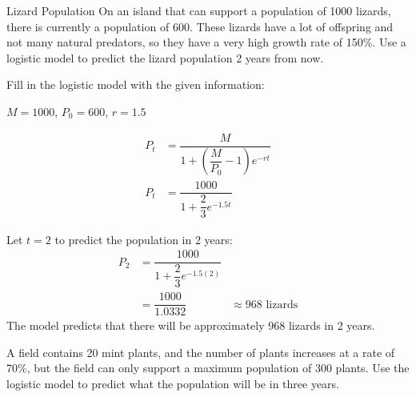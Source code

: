 \begin{example}[https://www.youtube.com/watch?v=cd5xQCfLUZM&list=PLfmpjsIzhztutjEb8Pg5OBOlI1p80yVoy&index=13]{Lizard Population}
On an island that can support a population of 1000 lizards, there is currently a population of 600.  These lizards have a lot of offspring and not many natural predators, so they have a very high growth rate of 150\%.  Use a logistic model to predict the lizard population 2 years from now.

\solline
{}
Fill in the logistic model with the given information:
\begin{center}
$M=1000$, $P_0=600$, $r=1.5$
\end{center}
\begin{align*}
P_t &= \dfrac{M}{1+\left(\dfrac{M}{P_0}-1\right)e^{-rt}}\\
P_t &= \dfrac{1000}{1+\dfrac{2}{3}e^{-1.5t}}
\end{align*}

\begin{center}
\end{center}

Let $t=2$ to predict the population in 2 years:
\begin{align*}
P_2 &= \dfrac{1000}{1+\dfrac{2}{3}e^{-1.5(2)}}\\
 &= \dfrac{1000}{1.0332}
 &\approx \boxed{968 \textrm{ lizards}}
\end{align*}
The model predicts that there will be approximately 968 lizards in 2 years.
\end{example}

\begin{try}
A field contains 20 mint plants, and the number of plants increases at a rate of 70\%, but the field can only support a maximum population of 300 plants.  Use the logistic model to predict what the population will be in three years.
\end{try}

